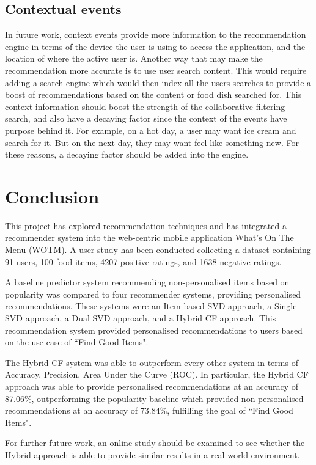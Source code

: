 \subsection{Contextual events}
In future work, context events provide more information to the recommendation engine in terms of the device the user is using to access the application, and the location of where the active user is. Another way that may make the recommendation more accurate is to use user search content. This would require adding a search engine which would then index all the users searches to provide a boost of recommendations based on the content or food dish searched for. This context information should boost the strength of the collaborative filtering search, and also have a decaying factor since the context of the events have purpose behind it. For example, on a hot day, a user may want ice cream and search for it. But on the next day, they may want feel like something new. For these reasons, a decaying factor should be added into the engine.

\section{Conclusion}

This project has explored recommendation techniques and has integrated a recommender system into the web-centric mobile application What's On The Menu (WOTM). A user study has been conducted collecting a dataset containing 91 users, 100 food items, 4207 positive ratings, and 1638 negative ratings.

A baseline predictor system recommending non-personalised items based on popularity was compared to four recommender systems, providing personalised recommendations. These systems were an Item-based SVD approach, a Single SVD approach, a Dual SVD approach, and a Hybrid CF approach. This recommendation system provided personalised recommendations to users based on the use case of ``Find Good Items". 

The Hybrid CF system was able to outperform every other system in terms of Accuracy, Precision, Area Under the Curve (ROC). In particular, the Hybrid CF approach was able to provide personalised recommendations at an accuracy of 87.06\%, outperforming the popularity baseline which provided non-personalised recommendations at an accuracy of 73.84\%, fulfilling the goal of ``Find Good Items".  

For further future work, an online study should be examined to see whether the Hybrid approach is able to provide similar results in a real world environment.